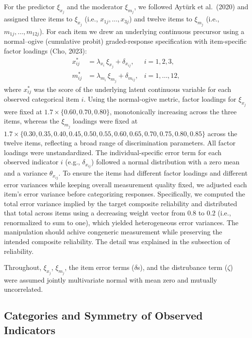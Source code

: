\documentclass[
  man]{apa6}
\begin{document}
For the predictor \(\xi_{x_{j}}\) and the moderator \(\xi_{m_{j}}\), we followed Aytürk et al.~(2020) and assigned three items to \(\xi_{x_{j}}\) (i.e., \(x_{1j},\ldots,x_{3j}\)) and twelve items to \(\xi_{m_{j}}\) (i.e., \(m_{1j},\ldots,m_{12j}\)). For each item we drew an underlying continuous precursor using a normal--ogive (cumulative probit) graded-response specification with item-specific factor loadings (Cho, 2023):
\begin{align}
x^{\ast}_{ij} &= \lambda_{x_i}\,\xi_{x_j} + \delta_{x_{ij}}, 
& i=1,2,3, \\
m^{\ast}_{ij} &= \lambda_{m_i}\,\xi_{m_j} + \delta_{m_{ij}}, 
& i=1,\ldots,12,
\end{align}
where \(x_{ij}^*\) was the score of the underlying latent continuous variable for each observed categorical item \(i\). Using the normal-ogive metric, factor loadings for \(\xi_{x_j}\) were fixed at \(1.7 \times \{0.60, 0.70, 0.80\}\), monotonically increasing across the three items, whereas the \(\xi_{m_j}\) loadings were fixed at \(1.7 \times \{0.30, 0.35, 0.40, 0.45, 0.50, 0.55, 0.60, 0.65, 0.70, 0.75, 0.80, 0.85\}\) across the twelve items, reflecting a broad range of discrimination parameters. All factor loadings were unstandardized. The individual-specific error term for each observed indicator \(i\) (e.g., \(\delta_{x_{ij}}\)) followed a normal distribution with a zero mean and a variance \(\theta_{x_{ij}}\). To ensure the items had different factor loadings and different error variances while keeping overall measurement quality fixed, we adjusted each item's error variance before categorizing responses. Specifically, we computed the total error variance implied by the target composite reliability and distributed that total across items using a decreasing weight vector from 0.8 to 0.2 (i.e., renormalized to sum to one), which yielded heterogeneous error variances. The manipulation should achive congeneric measurement while preserving the intended composite reliability. The detail was explained in the subsection of reliability.

Throughout, \(\xi_{x_j}\), \(\xi_{m_j}\), the item error terms (\(\delta\)s), and the distrubance term (\(\zeta\)) were assumed jointly multivariate normal with mean zero and mutually uncorrelated.

\subsection{Categories and Symmetry of Observed Indicators}\label{categories-and-symmetry-of-observed-indicators}
\end{document}

